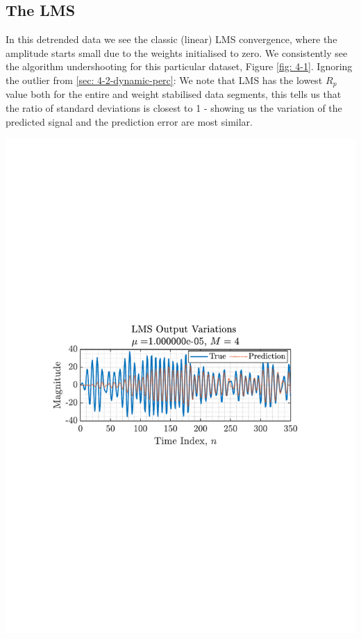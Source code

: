 \documentclass[12pt]{article}
\numberwithin{equation}{section}
\begin{document}
	\subsection{The LMS} \label{sec: 4-1-LMS}
		\begin{minipage}[b]{0.49\textwidth}
			In this detrended data we see the classic (linear) LMS convergence, where the amplitude starts small due to the weights initialised to zero. We consistently see the algorithm undershooting for this particular dataset, Figure \ref{fig: 4-1}. Ignoring the outlier from \ref{sec: 4-2-dynamic-perc}: We note that LMS has the lowest $R_p$ value both for the entire and weight stabilised data segments, this tells us that the ratio of standard deviations is closest to 1 - showing us the variation of the predicted signal and the prediction error are  most similar.
		\end{minipage}%
		\begin{minipage}{0.04\textwidth}
			\hspace*{0.04\textwidth}
		\end{minipage}%
		\begin{minipage}[b]{0.49\textwidth}
			\centering
			\includegraphics[trim={2.2cm 11.2cm 3.15cm  11.2cm}, clip, width=\textwidth]{../MATLAB/figures/q4_1_fig01.pdf} 
			\captionsetup{justification=centering}
			\label{fig: 4-1}
		\end{minipage}%
	
\end{document}
